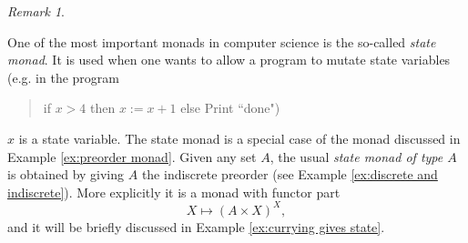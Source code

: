 \documentclass{book}
\theoremstyle{remark}
\newtheorem{remark}[subsubsection]{Remark}
\theoremstyle{definition}
\begin{document}
\begin{remark}\label{rem:state monad}

One of the most important monads in computer science is the so-called {\em state monad}. It is used when one wants to allow a program to mutate state variables (e.g. in the program 
\begin{quote}if $x>4$ then $x:=x+1$ else Print ``done")\end{quote}
$x$ is a state variable. The state monad is a special case of the monad discussed in Example \ref{ex:preorder monad}. Given any set $A$, the usual {\em state monad of type $A$} is obtained by giving $A$ the indiscrete preorder (see Example \ref{ex:discrete and indiscrete}). More explicitly it is a monad with functor part $$X\mapsto (A\times X)^X,$$ and it will be briefly discussed in Example \ref{ex:currying gives state}.

\end{remark}
\end{document}
